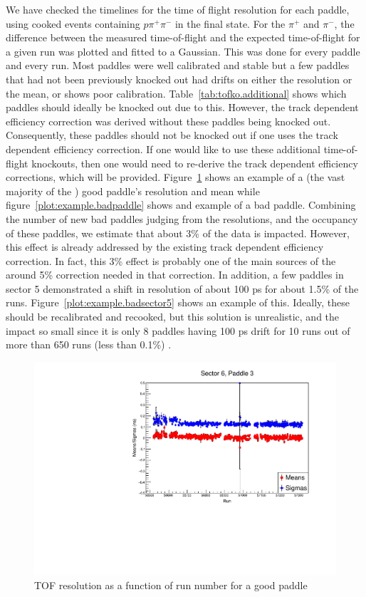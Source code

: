 \documentclass[ 12 pt]{article}
\begin{document}
\begin{itemize}
We have checked the timelines for the time of flight resolution for each paddle, using cooked events containing $p \pi^{+} \pi^{-}$ in the final state. For the $\pi^{+}$ and $\pi^{-}$, the difference between the measured time-of-flight and the expected time-of-flight for a given run was plotted and fitted to a Gaussian. This was done for every paddle and every run.  Most paddles were well calibrated and stable but a few paddles that had not been previously knocked out had drifts on either the resolution or the mean, or shows poor calibration. Table~\ref{tab:tofko.additional} shows which paddles should ideally be knocked out due to this. However, the track dependent efficiency correction was derived without these paddles being knocked out. Consequently, these paddles should not be knocked out if one uses the track dependent efficiency correction. If one would like to use these additional time-of-flight knockouts, then one would need to re-derive the track dependent efficiency corrections, which will be provided. Figure~\ref{plot:example.goodpaddle} shows an example of a (the vast majority of the ) good paddle's resolution and mean  while figure~\ref{plot:example.badpaddle} shows and example of a bad paddle. Combining the number of new bad paddles judging from the resolutions, and the occupancy of these paddles, we estimate that about 3\% of the data is impacted. However, this effect is already addressed by the existing track dependent efficiency correction. In fact, this 3\% effect is probably one of the main sources of the around 5\% correction needed in that correction.  In addition, a few paddles in sector 5 demonstrated a shift in resolution of about 100 ps for about 1.5\% of the runs. Figure~\ref{plot:example.badsector5} shows an example of this. Ideally, these should be recalibrated and recooked, but this solution is unrealistic, and the impact so small since it is only 8 paddles having 100 ps drift for 10 runs out of more than 650 runs (less than 0.1\%) .




\begin{figure}\begin{center}
      \includegraphics[width=0.6\columnwidth]{figures/calib/tof/goodexample.pdf}
   \caption{\label{plot:example.goodpaddle}TOF resolution as a function of run number for a good paddle}
\end{center}\end{figure}


\end{itemize}
\end{document}
